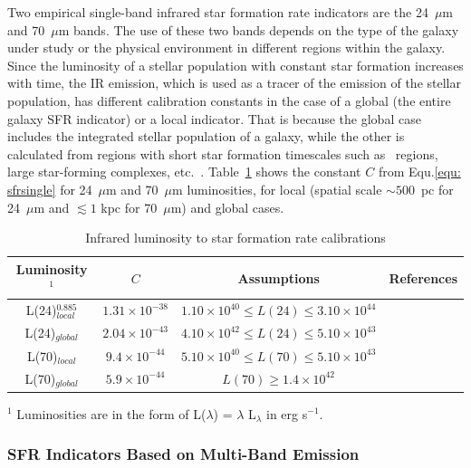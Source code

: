 Two empirical single-band infrared star formation rate indicators are the 24~$\mu$m and 70~$\mu$m bands.  
The use of these two bands depends on the type of the galaxy under study or the physical environment in different regions within the galaxy. 
Since the luminosity of a stellar population with constant star formation increases with time, the IR emission, which is used as a tracer of the emission of the stellar population, has different calibration constants in the case of a global (the entire galaxy SFR indicator) or a local indicator.
That is because the global case includes the integrated stellar population of a galaxy, while the other is calculated from regions with short star formation timescales such as \hii~regions, large star-forming complexes, etc.~\cite{Calzetti13}.
Table~\ref{table2} shows the constant $C$ from Equ.\ref{equ: sfrsingle} for 24~$\mu$m and 70~$\mu$m luminosities, for local (spatial scale $\sim500$~pc for 24~$\mu$m and $\lesssim 1$ kpc for 70~$\mu$m) and global cases. 
\begin{center}
\begin{table}
\caption{Infrared luminosity to star formation rate calibrations}
\label{table2}
\begin{tabular}{ c c c c }
\hline\hline
Luminosity$^1$ & $C$ & Assumptions & References\\ 
\hline
L(24)$^{0.885}_{local}$ & $1.31 \times 10^{-38}$ &$1.10\times 10^{40} \le L(24) \le 3.10\times 10^{44}$&  \cite{Calzetti07}   \\ 
L(24)$_{global}$ & $2.04 \times 10^{-43}$ &$ 4.10\times 10^{42} \le L(24)  \le 5.10\times 10^{43}$& \cite{Calzetti07} \\
L(70)$_{local}$ & $9.4 \times 10^{-44} $ &$5.10\times 10^{40} \le  L(70) \le 5.10\times 10^{43}$& \cite{Li12} \\
L(70)$_{global}$& $5.9 \times 10^{-44}$ &$L(70) \ge 1.4 \times 10^{42} $& \cite{Li10}\\
\hline
\end{tabular}
\begin{tablenotes}
\item $^1$ Luminosities are in the form of L($\lambda$) = $\lambda$ L$_{\lambda}$ in erg s$^{-1}$.
\end{tablenotes}
\end{table}  
\end{center}



\subsubsection*{SFR Indicators Based on Multi-Band Emission}

